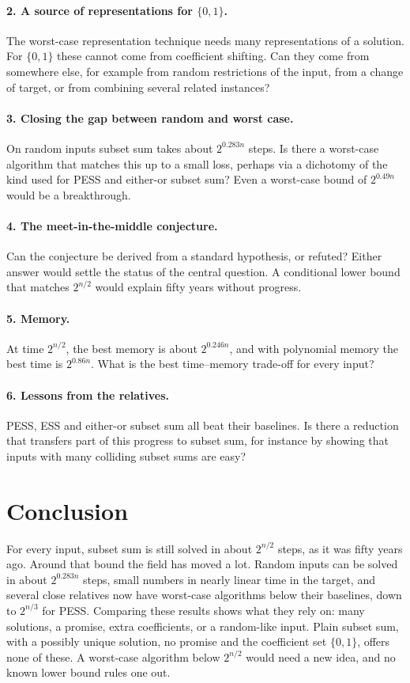 \documentclass[11pt]{article}
\begin{document}
\paragraph{2. A source of representations for $\{0,1\}$.}
The worst-case representation technique needs many representations of a
solution. For $\{0,1\}$ these cannot come from coefficient shifting. Can they
come from somewhere else, for example from random restrictions of the input,
from a change of target, or from combining several related instances?

\paragraph{3. Closing the gap between random and worst case.}
On random inputs subset sum takes about $2^{0.283n}$ steps. Is there a
worst-case algorithm that matches this up to a small loss, perhaps via a
dichotomy of the kind used for PESS and either-or subset sum? Even a worst-case
bound of $2^{0.49n}$ would be a breakthrough.

\paragraph{4. The meet-in-the-middle conjecture.}
Can the conjecture be derived from a standard hypothesis, or refuted? Either
answer would settle the status of the central question. A conditional lower
bound that matches $2^{n/2}$ would explain fifty years without progress.

\paragraph{5. Memory.}
At time $2^{n/2}$, the best memory is about $2^{0.246n}$, and with polynomial
memory the best time is $2^{0.86n}$. What is the best time--memory trade-off
for every input?

\paragraph{6. Lessons from the relatives.}
PESS, ESS and either-or subset sum all beat their baselines. Is there a
reduction that transfers part of this progress to subset sum, for instance by
showing that inputs with many colliding subset sums are easy?

\section{Conclusion}
For every input, subset sum is still solved in about $2^{n/2}$ steps, as it was
fifty years ago. Around that bound the field has moved a lot. Random inputs can
be solved in about $2^{0.283n}$ steps, small numbers in nearly linear time in
the target, and several close relatives now have worst-case algorithms below
their baselines, down to $2^{n/3}$ for PESS. Comparing these results shows what
they rely on: many solutions, a promise, extra coefficients, or a random-like
input. Plain subset sum, with a possibly unique solution, no promise and the
coefficient set $\{0,1\}$, offers none of these. A worst-case algorithm below
$2^{n/2}$ would need a new idea, and no known lower bound rules one out.
\end{document}
